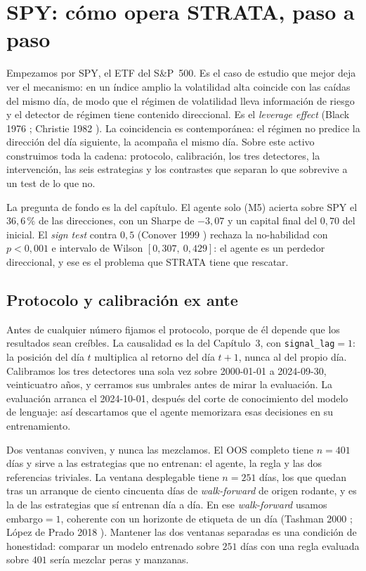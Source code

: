 \section{SPY: cómo opera STRATA, paso a paso}
\label{sec:mp-spy}


Empezamos por SPY, el ETF del S\&P~500. Es el caso de estudio que mejor deja ver el mecanismo: en un índice amplio la volatilidad alta coincide con las caídas del mismo día, de modo que el régimen de volatilidad lleva información de riesgo y el detector de régimen tiene contenido direccional. Es el \emph{leverage effect} (Black 1976 \cite{black1976}; Christie 1982 \cite{christie1982}). La coincidencia es contemporánea: el régimen no predice la dirección del día siguiente, la acompaña el mismo día. Sobre este activo construimos toda la cadena: protocolo, calibración, los tres detectores, la intervención, las seis estrategias y los contrastes que separan lo que sobrevive a un test de lo que no.

La pregunta de fondo es la del capítulo. El agente solo (M5) acierta sobre SPY el $36{,}6\,\%$ de las direcciones, con un Sharpe de $-3{,}07$ y un capital final del $0{,}70$ del inicial. El \emph{sign test} contra $0{,}5$ (Conover 1999 \cite{conover1999}) rechaza la no-habilidad con $p < 0{,}001$ e intervalo de Wilson $[0{,}307,\ 0{,}429]$: el agente es un perdedor direccional, y ese es el problema que STRATA tiene que rescatar.

\subsection{Protocolo y calibración ex ante}
\label{sec:mp-spy-protocolo}

Antes de cualquier número fijamos el protocolo, porque de él depende que los resultados sean creíbles. La causalidad es la del Capítulo~3, con \texttt{signal\_lag}${}=1$: la posición del día $t$ multiplica al retorno del día $t+1$, nunca al del propio día. Calibramos los tres detectores una sola vez sobre 2000-01-01 a 2024-09-30, veinticuatro años, y cerramos sus umbrales antes de mirar la evaluación. La evaluación arranca el 2024-10-01, después del corte de conocimiento del modelo de lenguaje: así descartamos que el agente memorizara esas decisiones en su entrenamiento.

Dos ventanas conviven, y nunca las mezclamos. El OOS completo tiene $n = 401$ días y sirve a las estrategias que no entrenan: el agente, la regla y las dos referencias triviales. La ventana desplegable tiene $n = 251$ días, los que quedan tras un arranque de ciento cincuenta días de \emph{walk-forward} de origen rodante, y es la de las estrategias que sí entrenan día a día. En ese \emph{walk-forward} usamos embargo${}=1$, coherente con un horizonte de etiqueta de un día (Tashman 2000 \cite{tashman2000}; López de Prado 2018 \cite{lopezdeprado2018}). Mantener las dos ventanas separadas es una condición de honestidad: comparar un modelo entrenado sobre $251$ días con una regla evaluada sobre $401$ sería mezclar peras y manzanas.


